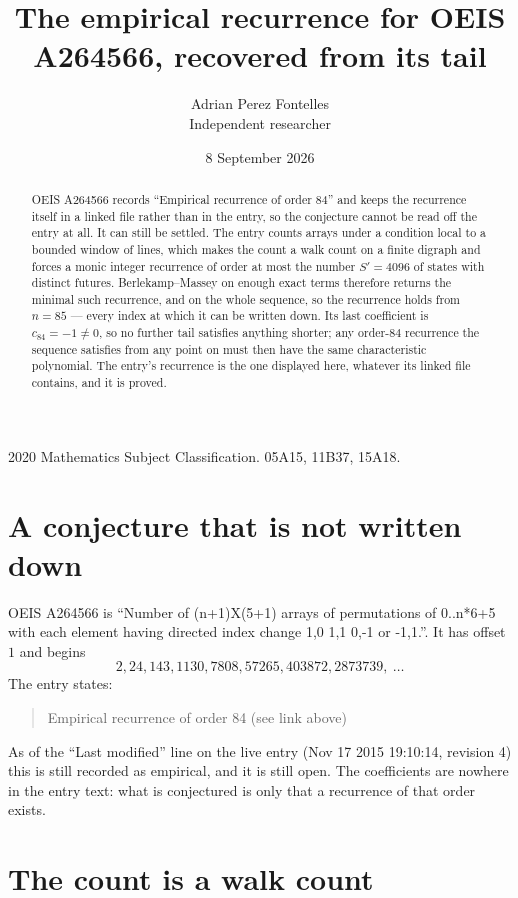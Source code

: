 \documentclass[11pt,a4paper]{article}
\title{The empirical recurrence for OEIS A264566, recovered from its tail}
\author{Adrian Perez Fontelles\\ \small Independent researcher}
\date{8 September 2026}
\theoremstyle{plain}
\theoremstyle{definition}
\begin{document}
\maketitle

\begin{abstract}
OEIS A264566 records ``Empirical recurrence of order $84$'' and keeps the recurrence itself in
a linked file rather than in the entry, so the conjecture cannot be read off the entry at all.
It can still be settled. The entry counts arrays under a condition local to a bounded window of
lines, which makes the count a walk count on a finite digraph and forces a monic integer
recurrence of order at most the number $S'=4096$ of states with distinct futures. Berlekamp--Massey on
enough exact terms therefore returns the minimal such recurrence, and on the whole sequence, so the recurrence holds from $n=85$ --- every index at which it can be written down.
Its last coefficient is $c_{84}=-1\neq0$, so no further tail satisfies anything
shorter; any order-$84$ recurrence the sequence satisfies from any point on must then have
the same characteristic polynomial. The entry's recurrence is the one displayed here, whatever
its linked file contains, and it is proved.
\end{abstract}

\noindent\small 2020 Mathematics Subject Classification. 05A15, 11B37, 15A18.\normalsize

\section{A conjecture that is not written down}

OEIS A264566 is ``Number of (n+1)X(5+1) arrays of permutations of 0..n*6+5 with each element having directed index change 1,0 1,1 0,-1 or -1,1.''. It has offset $1$ and begins
\[
2, 24, 143, 1130, 7808, 57265, 403872, 2873739,\ \dots
\]
The entry states:
\begin{quote}
Empirical recurrence of order 84 (see link above)
\end{quote}
As of the ``Last modified'' line on the live entry (Nov 17 2015 19:10:14, revision 4)
this is still recorded as empirical, and it is still open. The coefficients are nowhere in the
entry text: what is conjectured is only that a recurrence of that order exists.

\section{The count is a walk count}
\end{document}
